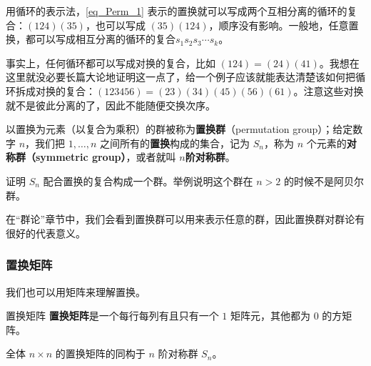 用循环的表示法，\autoref{eq_Perm_1}  表示的置换就可以写成两个互相分离的循环的复合：$(1 2 4)(3 5)$，也可以写成 $(3 5 )(1 2 4)$，顺序没有影响。一般地，任意置换，都可以写成相互分离的循环的复合$s_1s_2s_3\cdots s_k$。

事实上，任何循环都可以写成对换的复合，比如 $(1 2 4) = (2 4)(4 1)$。我想在这里就没必要长篇大论地证明这一点了，给一个例子应该就能表达清楚该如何把循环拆成对换的复合：$(1 2 3 4 5 6) = (2 3)(3 4)(4 5)(5 6)(6 1)$。注意这些对换就不是彼此分离的了，因此不能随便交换次序。

以置换为元素（以复合为乘积）的群被称为\textbf{置换群}（permutation group）；给定数字 $n$，我们把 $1, \dots, n$ 之间所有的\textbf{置换}构成的集合，记为 $S_n$，称为 $n$ 个元素的\textbf{对称群（symmetric group）}，或者就叫 $n$\textbf{阶对称群}。

\begin{exercise}{}
证明 $S_n$ 配合置换的复合构成一个群。举例说明这个群在 $n>2$ 的时候不是阿贝尔群。
\end{exercise}

在“群论”章节中，我们会看到置换群可以用来表示任意的群，因此置换群对群论有很好的代表意义。

\subsubsection{置换矩阵}

我们也可以用矩阵来理解置换。

\begin{definition}{置换矩阵}
\textbf{置换矩阵}是一个每行每列有且只有一个 $1$ 矩阵元，其他都为 $0$ 的方矩阵。
\end{definition}

\begin{theorem}{}
全体 $n \times n$ 的置换矩阵的同构于 $n$ 阶对称群 $S_n$。
\end{theorem}








